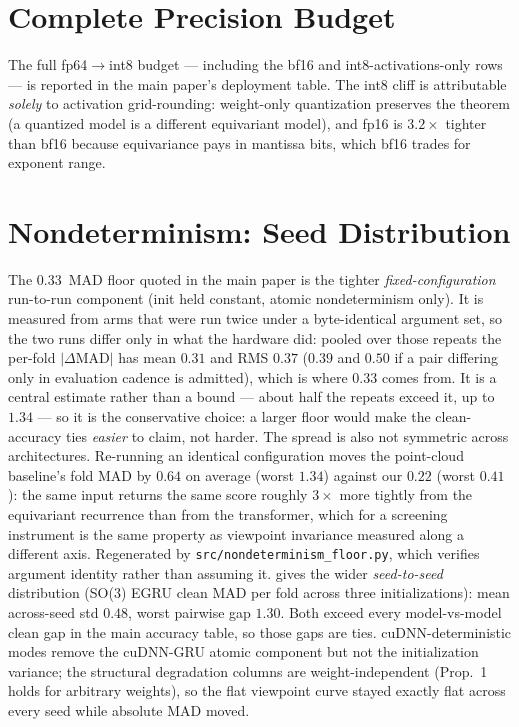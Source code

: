 \documentclass[10pt,twocolumn,letterpaper]{article}
\begin{document}
\section{Complete Precision Budget}\label{sec:supp:prec}
The full fp64$\to$int8 budget --- including the bf16 and int8-activations-only rows --- is reported in
the main paper's deployment table. The int8 cliff is attributable \emph{solely} to activation
grid-rounding: weight-only quantization preserves the theorem (a quantized model is a different
equivariant model), and fp16 is $3.2\times$ tighter than bf16 because equivariance pays in mantissa
bits, which bf16 trades for exponent range.

\section{Nondeterminism: Seed Distribution}\label{sec:supp:seed}
The $0.33$~MAD floor quoted in the main paper is the tighter \emph{fixed-configuration} run-to-run
component (init held constant, atomic nondeterminism only). It is measured from arms that were run
twice under a byte-identical argument set, so the two runs differ only in what the hardware did:
pooled over those repeats the per-fold $|\Delta\mathrm{MAD}|$ has mean $0.31$ and RMS $0.37$ ($0.39$
and $0.50$ if a pair differing only in evaluation cadence is admitted), which is where $0.33$ comes
from. It is a central estimate rather than a bound --- about half the repeats exceed it, up to
$1.34$ --- so it is the conservative choice: a larger floor would make the clean-accuracy ties
\emph{easier} to claim, not harder. The spread is also not symmetric across architectures. Re-running
an identical configuration moves the point-cloud baseline's fold MAD by $0.64$ on average (worst
$1.34$) against our $0.22$ (worst $0.41$): the same input returns the same score roughly $3\times$
more tightly from the equivariant recurrence than from the transformer, which for a screening
instrument is the same property as viewpoint invariance measured along a different axis. Regenerated
by \texttt{src/nondeterminism\_floor.py}, which verifies argument identity rather than assuming it.
 gives the wider
\emph{seed-to-seed} distribution (SO(3) EGRU clean MAD per fold across three initializations): mean
across-seed std $0.48$, worst pairwise gap $1.30$. Both exceed every model-vs-model clean gap in the
main accuracy table, so those gaps are ties. cuDNN-deterministic modes remove the cuDNN-GRU atomic
component but not the initialization variance; the structural degradation columns are weight-independent
(Prop.~1 holds for arbitrary weights), so the flat viewpoint curve stayed exactly flat across every seed
while absolute MAD moved.
\end{document}
